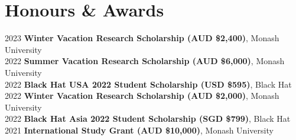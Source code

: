 \section{Honours \& Awards}
\begin{itemize}[leftmargin=0.15in, label={}]
    \small{\item{
        {2023}{ \textbf{Winter Vacation Research Scholarship (AUD \$2,400)}, Monash University} \\
        {2022}{ \textbf{Summer Vacation Research Scholarship (AUD \$6,000)}, Monash University} \\
        {2022}{ \textbf{Black Hat USA 2022 Student Scholarship (USD \$595)}, Black Hat} \\
        {2022}{ \textbf{Winter Vacation Research Scholarship (AUD \$2,000)}, Monash University} \\
        {2022}{ \textbf{Black Hat Asia 2022 Student Scholarship (SGD \$799)}, Black Hat} \\
        {2021}{ \textbf{International Study Grant (AUD \$10,000)}, Monash University} \\
    }}
\end{itemize}

